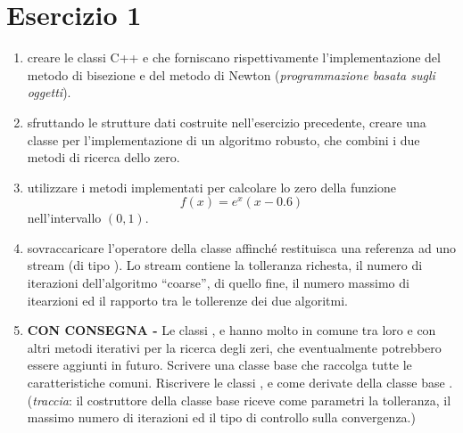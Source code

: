 \section*{Esercizio 1}

\begin{enumerate}
    \item creare le classi C++  e  che
        forniscano rispettivamente l'implementazione del
        metodo di bisezione e del metodo di Newton (\textit{programmazione
        basata sugli oggetti}).

    \item sfruttando le strutture dati costruite nell'esercizio
        precedente, creare una classe  per l'implementazione di
        un algoritmo robusto, che combini i due metodi di ricerca dello zero.

    \item utilizzare i metodi implementati per calcolare lo zero della funzione
        \begin{equation*}
            f(x) = e^x (x - 0.6)
        \end{equation*}
        nell'intervallo $(0, 1)$.

    \item sovraccaricare l'operatore \cpp{\<\<} della classe 
        affinch\'e restituisca una referenza ad uno stream (di tipo ).
        Lo stream contiene la tolleranza richesta, il numero di iterazioni dell'algoritmo
        ``coarse'', di quello fine, il numero massimo di itearzioni ed il rapporto
        tra le tollerenze dei due algoritmi.

    \item {\bf CON CONSEGNA -} Le classi ,  e 
        hanno molto in comune tra loro e con altri metodi iterativi per la ricerca degli zeri,
        che eventualmente potrebbero essere aggiunti in futuro.
        Scrivere una classe base  che raccolga tutte le caratteristiche
        comuni. Riscrivere le classi ,  e  come
        derivate della classe base .
        (\emph{traccia}: il costruttore della classe base riceve come parametri la
        tolleranza, il massimo numero di iterazioni ed il tipo di controllo
        sulla convergenza.)

\end{enumerate}
